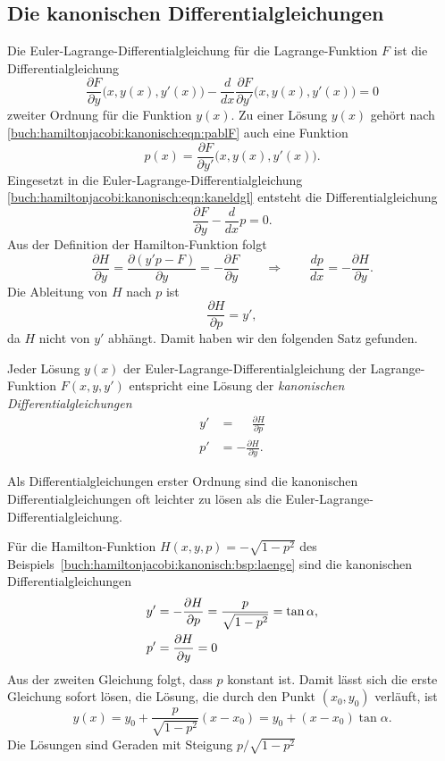 %
%
\subsection{Die kanonischen Differentialgleichungen}
Die Euler-Lagrange-Differentialgleichung für die Lagrange-Funktion $F$ ist 
die Differentialgleichung
\begin{equation}
\frac{\partial F}{\partial y}\bigl(x,y(x),y'(x)\bigr)
-
\frac{d}{dx}
\frac{\partial F}{\partial y'}\bigl(x,y(x),y'(x)\bigr)
=
0
\label{buch:hamiltonjacobi:kanonisch:eqn:kaneldgl}
\end{equation}
zweiter Ordnung für die Funktion $y(x)$.
Zu einer Lösung $y(x)$ gehört nach
\eqref{buch:hamiltonjacobi:kanonisch:eqn:pablF}
auch eine Funktion
\[
p(x)
=
\frac{\partial F}{\partial y'}\bigl(x,y(x),y'(x)\bigr).
\]
Eingesetzt in die Euler-Lagrange-Differentialgleichung
\eqref{buch:hamiltonjacobi:kanonisch:eqn:kaneldgl}
entsteht die Differentialgleichung
\[
\frac{\partial F}{\partial y}
-
\frac{d}{dx}p
=
0.
\]
Aus der Definition der Hamilton-Funktion folgt
\[
\frac{\partial H}{\partial y}
=
\frac{\partial(y'p-F)}{\partial y}
=
-\frac{\partial F}{\partial y}
\qquad\Rightarrow\qquad
\frac{dp}{dx}
=
-
\frac{\partial H}{\partial y}.
\]
Die Ableitung von $H$ nach $p$ ist
\[
\frac{\partial H}{\partial p}
=
y',
\]
da $H$ nicht von $y'$ abhängt.
Damit haben wir den folgenden Satz gefunden.

\begin{satz}
Jeder Lösung $y(x)$ der Euler-Lagrange-Differentialgleichung der
Lagrange-Funktion $F(x,y,y')$ entspricht eine Lösung
der {\em kanonischen Differentialgleichungen}
\begin{equation}
\begin{aligned}
y'&=\phantom{-}\frac{\partial H}{\partial p}
\\
p'&=-\frac{\partial H}{\partial y}.
\end{aligned}
\end{equation}
\end{satz}

Als Differentialgleichungen erster Ordnung sind die kanonischen
Differentialgleichungen oft leichter zu lösen als die
Euler-Lagrange-Differentialgleichung.

\begin{beispiel}
Für die Hamilton-Funktion 
$H(x,y,p) = -\sqrt{1-p^2}$
des Beispiels~\ref{buch:hamiltonjacobi:kanonisch:bsp:laenge} sind
die kanonischen Differentialgleichungen
\begin{align}
y'
&=
-\frac{\partial H}{\partial p}
=
\frac{p}{\sqrt{1-p^2}} = \tan\alpha,
\notag
\\
p'
&=
\frac{\partial H}{\partial y}=0
\notag
\end{align}
Aus der zweiten Gleichung folgt, dass $p$ konstant ist.
Damit lässt sich die erste Gleichung sofort lösen, die Lösung, die
durch den Punkt $(x_0,y_0)$ verläuft, ist
\[
y(x)
=
y_0+\frac{p}{\sqrt{1-p^2}}(x-x_0)
=
y_0+ (x-x_0) \tan\alpha.
\]
Die Lösungen sind Geraden mit Steigung $p/\sqrt{1-p^2}$
\end{beispiel}

